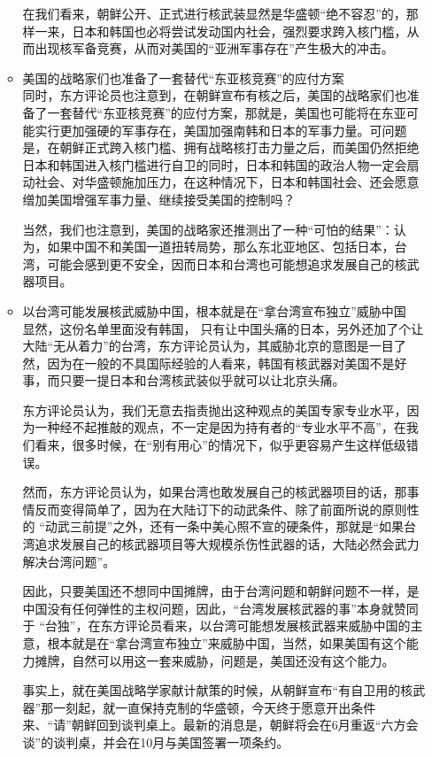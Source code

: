 \documentclass[a4paper,11pt]{article}
\begin{document}
\begin{itemize}
\begin{itemize}
    在我们看来，朝鲜公开、正式进行核武装显然是华盛顿“绝不容忍”的，那样一来，日本和韩国也必将尝试发动国内社会，强烈要求跨入核门槛，从而出现核军备竞赛，从而对美国的“亚洲军事存在”产生极大的冲击。
 

\item 美国的战略家们也准备了一套替代“东亚核竞赛”的应付方案\\
\label{sec-1_3_8}%
同时，东方评论员也注意到，在朝鲜宣布有核之后，美国的战略家们也准备了一套替代“东亚核竞赛”的应付方案，那就是，美国也可能将在东亚可能实行更加强硬的军事存在，美国加强南韩和日本的军事力量。可问题是，在朝鲜正式跨入核门槛、拥有战略核打击力量之后，而美国仍然拒绝日本和韩国进入核门槛进行自卫的同时，日本和韩国的政治人物一定会扇动社会、对华盛顿施加压力，在这种情况下，日本和韩国社会、还会愿意缯加美国增强军事力量、继续接受美国的控制吗？

    当然，我们也注意到，美国的战略家还推测出了一种“可怕的结果”：认为，如果中国不和美国一道扭转局势，那么东北亚地区、包括日本，台湾，可能会感到更不安全，因而日本和台湾也可能想追求发展自己的核武器项目。
 

\item 以台湾可能发展核武威胁中国，根本就是在“拿台湾宣布独立”威胁中国\\
\label{sec-1_3_9}%
显然，这份名单里面没有韩国， 只有让中国头痛的日本，另外还加了个让大陆“无从着力”的台湾，东方评论员认为，其威胁北京的意图是一目了然，因为在一般的不具国际经验的人看来，韩国有核武器对美国不是好事，而只要一提日本和台湾核武装似乎就可以让北京头痛。

    东方评论员认为，我们无意去指责抛出这种观点的美国专家专业水平，因为一种经不起推敲的观点，不一定是因为持有者的“专业水平不高”，在我们看来，很多时候，在“别有用心”的情况下，似乎更容易产生这样低级错误。

    然而，东方评论员认为，如果台湾也敢发展自己的核武器项目的话，那事情反而变得简单了，因为在大陆订下的动武条件、除了前面所说的原则性的 “动武三前提”之外，还有一条中美心照不宣的硬条件，那就是“如果台湾追求发展自己的核武器项目等大规模杀伤性武器的话，大陆必然会武力解决台湾问题”。

    因此，只要美国还不想同中国摊牌，由于台湾问题和朝鲜问题不一样，是中国没有任何弹性的主权问题，因此，“台湾发展核武器的事”本身就赞同于 “台独”，在东方评论员看来，以台湾可能想发展核武器来威胁中国的主意，根本就是在“拿台湾宣布独立”来威胁中国，当然，如果美国有这个能力摊牌，自然可以用这一套来威胁，问题是，美国还没有这个能力。

    事实上，就在美国战略学家献计献策的时候，从朝鲜宣布“有自卫用的核武器”那一刻起，就一直保持克制的华盛顿，今天终于愿意开出条件来、“请”朝鲜回到谈判桌上。最新的消息是，朝鲜将会在6月重返“六方会谈”的谈判桌，并会在10月与美国签署一项条约。


\end{itemize}
\end{itemize}
\end{document}
